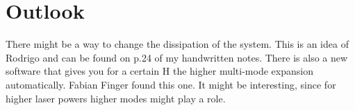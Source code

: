 \section{Outlook}
There might be a way to change the dissipation of the system. This is an idea of Rodrigo and can be found on p.24 of my handwritten notes. 
There is also a new software that gives you for a certain H the higher multi-mode expansion automatically. Fabian Finger found this one. It might be interesting, since for higher laser powers higher modes might play a role. 